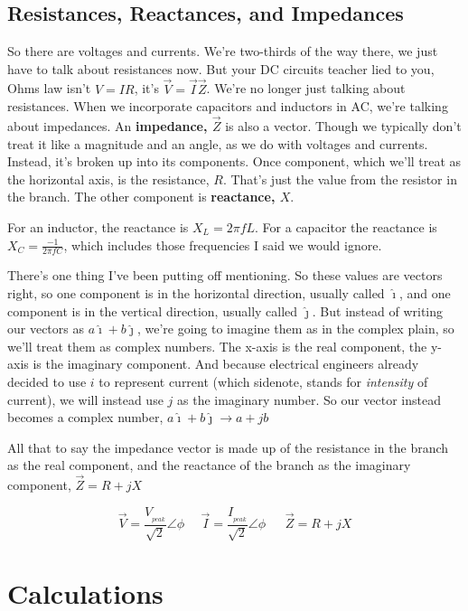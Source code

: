 \documentclass[12pt]{extarticle}
\begin{document}
\subsection{Resistances, Reactances, and Impedances}

So there are voltages and currents. We're two-thirds of the way there, we just have to talk about resistances now. But your DC circuits teacher lied to you, Ohms law isn't $V=IR$, it's $\vec{V}=\vec{I}\vec{Z}$. We're no longer just talking about resistances. When we incorporate capacitors and inductors in AC, we're talking about impedances. An \textbf{impedance, $\vec{Z}$} is also a vector. Though we typically don't treat it like a magnitude and an angle, as we do with voltages and currents. Instead, it's broken up into its components. Once component, which we'll treat as the horizontal axis, is the resistance, $R$. That's just the value from the resistor in the branch. The other component is \textbf{reactance, $X$}. 

For an inductor, the reactance is $ X_L = 2 \pi f L$. For a capacitor the reactance is $X_C = \frac{-1}{2\pi f C}$, which includes those frequencies I said we would ignore. 

There's one thing I've been putting off mentioning. So these values are vectors right, so one component is in the horizontal direction, usually called $\hat \imath$, and one component is in the vertical direction, usually called $\hat \jmath$. But instead of writing our vectors as $a \hat \imath + b \hat \jmath$, we're going to imagine them as in the complex plain, so we'll treat them as complex numbers. The x-axis is the real component, the y-axis is the imaginary component. And because electrical engineers already decided to use $i$ to represent current (which sidenote, stands for \textit{intensity} of current), we will instead use $j$ as the imaginary number. So our vector instead becomes  a complex number, $a \hat \imath + b \hat \jmath \rightarrow a + jb$ 

All that to say the impedance vector is made up of the resistance in the branch as the real component, and the reactance of the branch as the imaginary component, $\vec{Z} = R + j X$

$$ \vec{V} = \frac{V_{_{peak}}}{\sqrt{2}} \angle \phi \ \ \ \ \ \ \vec{I} = \frac{I_{_{peak}}}{\sqrt{2}} \angle \phi \ \ \ \ \ \ \  \vec{Z} = R + j X$$


\section{Calculations}
\end{document}
